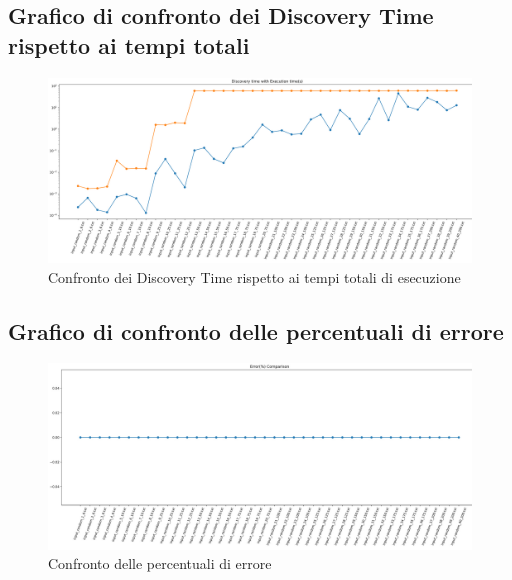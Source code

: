 \subsection{Grafico di confronto dei Discovery Time rispetto ai tempi totali}\label{confronto}
\begin{center}
	\begin{figure}[H]
		\centering
		\hspace{-1cm}\includegraphics[width=\linewidth]{Img/confronto_time_graph.jpg}
		\caption{Confronto dei Discovery Time rispetto ai tempi totali di esecuzione}
	\end{figure}
\end{center}

\subsection{Grafico di confronto delle percentuali di errore}
\begin{center}
	\begin{figure}[H]
		\centering
		\hspace{-1cm}\includegraphics[width=\linewidth]{Img/err_perc_graph.jpg}
		\caption{Confronto delle percentuali di errore}
	\end{figure}
\end{center}

\pagebreak